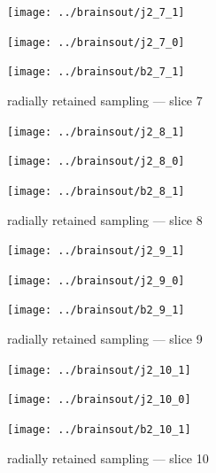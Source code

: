 \documentclass{article}
\begin{document}
\begin{figure}
\begin{centering}

\parbox{\imsize}{\texttt{[image: ../brainsout/j2\_7\_1]}}

\vspace{\vertsep}

\parbox{\imsize}{\texttt{[image: ../brainsout/j2\_7\_0]}}

\vspace{\vertsep}

\parbox{\imsize}{\texttt{[image: ../brainsout/b2\_7\_1]}}

\end{centering}
\caption{radially retained sampling --- slice 7}
\end{figure}


\begin{figure}
\begin{centering}

\parbox{\imsize}{\texttt{[image: ../brainsout/j2\_8\_1]}}

\vspace{\vertsep}

\parbox{\imsize}{\texttt{[image: ../brainsout/j2\_8\_0]}}

\vspace{\vertsep}

\parbox{\imsize}{\texttt{[image: ../brainsout/b2\_8\_1]}}

\end{centering}
\caption{radially retained sampling --- slice 8}
\end{figure}


\begin{figure}
\begin{centering}

\parbox{\imsize}{\texttt{[image: ../brainsout/j2\_9\_1]}}

\vspace{\vertsep}

\parbox{\imsize}{\texttt{[image: ../brainsout/j2\_9\_0]}}

\vspace{\vertsep}

\parbox{\imsize}{\texttt{[image: ../brainsout/b2\_9\_1]}}

\end{centering}
\caption{radially retained sampling --- slice 9}
\end{figure}


\begin{figure}
\begin{centering}

\parbox{\imsize}{\texttt{[image: ../brainsout/j2\_10\_1]}}

\vspace{\vertsep}

\parbox{\imsize}{\texttt{[image: ../brainsout/j2\_10\_0]}}

\vspace{\vertsep}

\parbox{\imsize}{\texttt{[image: ../brainsout/b2\_10\_1]}}

\end{centering}
\caption{radially retained sampling --- slice 10}
\end{figure}
\end{document}
